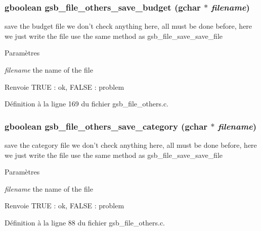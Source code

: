 \subsubsection[{gsb\_\-file\_\-others\_\-save\_\-budget}]{\setlength{\rightskip}{0pt plus 5cm}gboolean gsb\_\-file\_\-others\_\-save\_\-budget (gchar $\ast$ {\em filename})}\label{gsb__file__others_8c_a4abd0499f3d53596ab95c19c2196e34b}
save the budget file we don't check anything here, all must be done before, here we just write the file use the same method as gsb\_\-file\_\-save\_\-save\_\-file


\begin{DoxyParams}{Paramètres}
\item[{\em filename}]the name of the file\end{DoxyParams}
\begin{DoxyReturn}{Renvoie}
TRUE : ok, FALSE : problem 
\end{DoxyReturn}


Définition à la ligne 169 du fichier gsb\_\-file\_\-others.c.

\subsubsection[{gsb\_\-file\_\-others\_\-save\_\-category}]{\setlength{\rightskip}{0pt plus 5cm}gboolean gsb\_\-file\_\-others\_\-save\_\-category (gchar $\ast$ {\em filename})}\label{gsb__file__others_8c_a464a0f4acc3ce957fe2987d86c4e8f3e}
save the category file we don't check anything here, all must be done before, here we just write the file use the same method as gsb\_\-file\_\-save\_\-save\_\-file


\begin{DoxyParams}{Paramètres}
\item[{\em filename}]the name of the file\end{DoxyParams}
\begin{DoxyReturn}{Renvoie}
TRUE : ok, FALSE : problem 
\end{DoxyReturn}


Définition à la ligne 88 du fichier gsb\_\-file\_\-others.c.

